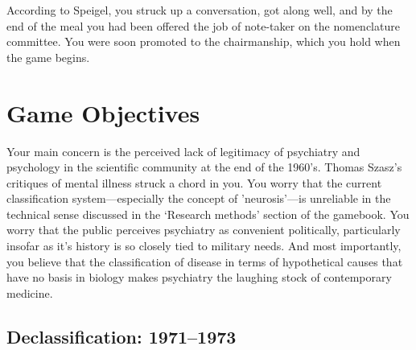 According to Speigel, you struck up a conversation, got along well, and by the end of the meal you had been offered the job of note-taker on the nomenclature committee. You were soon promoted to the chairmanship, which you hold when the game begins.

\section{Game Objectives}
\label{gameobjectives}

Your main concern is the perceived lack of legitimacy of psychiatry and psychology in the scientific community at the end of the 1960's. Thomas Szasz's critiques of mental illness struck a chord in you. You worry that the current classification system—especially the concept of 'neurosis'—is unreliable in the technical sense discussed in the `Research methods' section of the gamebook. You worry that the public perceives psychiatry as convenient politically, particularly insofar as it's history is so closely tied to military needs. And most importantly, you believe that the classification of disease in terms of hypothetical causes that have no basis in biology makes psychiatry the laughing stock of contemporary medicine.

\subsection{Declassification: 1971--1973}
\label{declassification:1971-1973}

